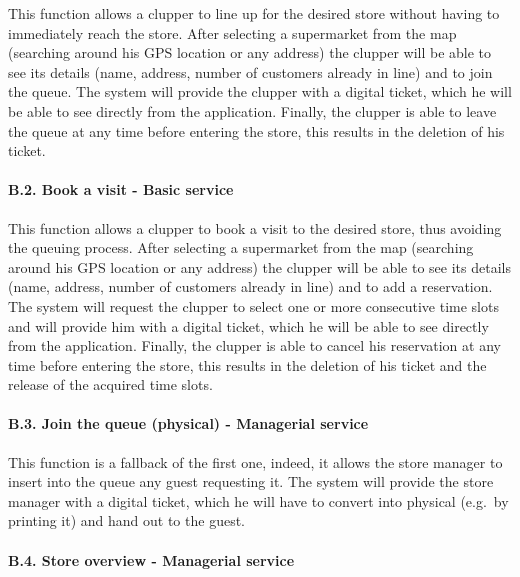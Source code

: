 This function allows a clupper to line up for the desired store without
having to immediately reach the store. After selecting a supermarket
from the map (searching around his GPS location or any address) the
clupper will be able to see its details (name, address, number of
customers already in line) and to join the queue. The system will
provide the clupper with a digital ticket, which he will be able to see
directly from the application. Finally, the clupper is able to leave the
queue at any time before entering the store, this results in the
deletion of his ticket.

\hypertarget{b.2.-book-a-visit---basic-service}{%
\paragraph{B.2. Book a visit - Basic
service}\label{b.2.-book-a-visit---basic-service}}

This function allows a clupper to book a visit to the desired store,
thus avoiding the queuing process. After selecting a supermarket from
the map (searching around his GPS location or any address) the clupper
will be able to see its details (name, address, number of customers
already in line) and to add a reservation. The system will request the
clupper to select one or more consecutive time slots and will provide
him with a digital ticket, which he will be able to see directly from
the application. Finally, the clupper is able to cancel his reservation
at any time before entering the store, this results in the deletion of
his ticket and the release of the acquired time slots.

\hypertarget{b.3.-join-the-queue-physical---managerial-service}{%
\paragraph{B.3. Join the queue (physical) - Managerial
service}\label{b.3.-join-the-queue-physical---managerial-service}}

This function is a fallback of the first one, indeed, it allows the
store manager to insert into the queue any guest requesting it. The
system will provide the store manager with a digital ticket, which he
will have to convert into physical (e.g.~by printing it) and hand out to
the guest.

\hypertarget{b.4.-store-overview---managerial-service}{%
\paragraph{B.4. Store overview - Managerial
service}\label{b.4.-store-overview---managerial-service}}

